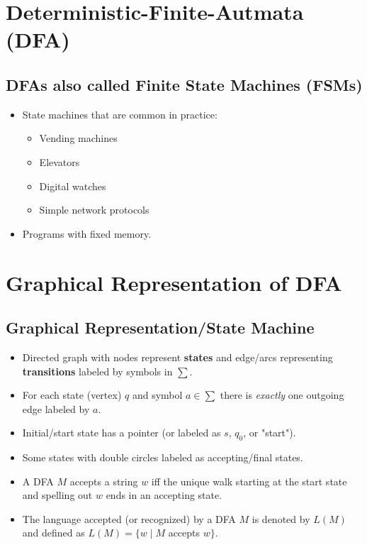 
\section{Deterministic-Finite-Autmata (DFA)}

\subsection{DFAs also called Finite State Machines (FSMs)}
\begin{itemize}
    \item State machines that are common in practice:
    \begin{itemize}
        \item Vending machines
        \item Elevators
        \item Digital watches
        \item Simple network protocols
    \end{itemize}
    \item Programs with fixed memory.
\end{itemize}

\section{Graphical Representation of DFA}

\subsection{Graphical Representation/State Machine}
\begin{itemize}
    \item Directed graph with nodes represent \textbf{states} and edge/arcs representing \textbf{transitions} labeled by symbols in $\sum$.
    \item For each state (vertex) $q$ and symbol $a \in \sum$ there is \textit{exactly} one outgoing edge labeled by $a$.
    \item Initial/start state has a pointer (or labeled as $s$, $q_0$, or "start").
    \item Some states with double circles labeled as accepting/final states.
    \item A DFA $M$ accepts a string $w$ iff the unique walk starting at the start state and spelling out $w$ ends in an accepting state.
    \item The language accepted (or recognized) by a DFA $M$ is denoted by $L(M)$ and defined as $L(M) = \{ w \mid M$ accepts $w \}$.
\end{itemize}

